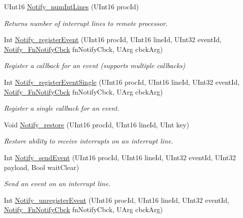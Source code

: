 \begin{DoxyCompactItemize}
U\-Int16 \hyperlink{_notify_8h_a195f48cdad4a2db36eb00bdbc752f8f9}{Notify\-\_\-num\-Int\-Lines} (U\-Int16 proc\-Id)
\begin{DoxyCompactList}\small\item\em Returns number of interrupt lines to remote processor. \end{DoxyCompactList}\item 
Int \hyperlink{_notify_8h_af0e6797faaeea3d07121ad83394dd1cb}{Notify\-\_\-register\-Event} (U\-Int16 proc\-Id, U\-Int16 line\-Id, U\-Int32 event\-Id, \hyperlink{_notify_8h_ab362f7571ee3d7f7abaa743914edcd62}{Notify\-\_\-\-Fn\-Notify\-Cbck} fn\-Notify\-Cbck, U\-Arg cbck\-Arg)
\begin{DoxyCompactList}\small\item\em Register a callback for an event (supports multiple callbacks) \end{DoxyCompactList}\item 
Int \hyperlink{_notify_8h_ad3d08088f515d57a3e4999a046267f49}{Notify\-\_\-register\-Event\-Single} (U\-Int16 proc\-Id, U\-Int16 line\-Id, U\-Int32 event\-Id, \hyperlink{_notify_8h_ab362f7571ee3d7f7abaa743914edcd62}{Notify\-\_\-\-Fn\-Notify\-Cbck} fn\-Notify\-Cbck, U\-Arg cbck\-Arg)
\begin{DoxyCompactList}\small\item\em Register a single callback for an event. \end{DoxyCompactList}\item 
Void \hyperlink{_notify_8h_a07248810e2b457664a2a1f24a4179621}{Notify\-\_\-restore} (U\-Int16 proc\-Id, U\-Int16 line\-Id, U\-Int key)
\begin{DoxyCompactList}\small\item\em Restore ability to receive interrupts on an interrupt line. \end{DoxyCompactList}\item 
Int \hyperlink{_notify_8h_ac0f8b4cb2245dd897b5b75485f6b5c13}{Notify\-\_\-send\-Event} (U\-Int16 proc\-Id, U\-Int16 line\-Id, U\-Int32 event\-Id, U\-Int32 payload, Bool wait\-Clear)
\begin{DoxyCompactList}\small\item\em Send an event on an interrupt line. \end{DoxyCompactList}\item 
Int \hyperlink{_notify_8h_a04733f534741df34fb5c0fbd7cbab8bc}{Notify\-\_\-unregister\-Event} (U\-Int16 proc\-Id, U\-Int16 line\-Id, U\-Int32 event\-Id, \hyperlink{_notify_8h_ab362f7571ee3d7f7abaa743914edcd62}{Notify\-\_\-\-Fn\-Notify\-Cbck} fn\-Notify\-Cbck, U\-Arg cbck\-Arg)

\end{DoxyCompactItemize}
